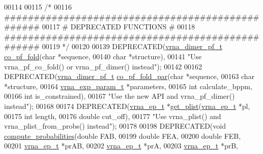 \begin{DoxyCode}
00114 
00115 \textcolor{comment}{/*}
00116 \textcolor{comment}{ #################################################}
00117 \textcolor{comment}{ # DEPRECATED FUNCTIONS                          #}
00118 \textcolor{comment}{ #################################################}
00119 \textcolor{comment}{ */}
00120 
00139 DEPRECATED(\hyperlink{group__pf__cofold_structvrna__dimer__pf__s}{vrna\_dimer\_pf\_t} \hyperlink{part__func__co_8h_ae5c1e7331718669bdae7a86de2be6184}{co\_pf\_fold}(\textcolor{keywordtype}{char}  *sequence,
00140                                       \textcolor{keywordtype}{char}  *structure),
00141 \textcolor{stringliteral}{"Use vrna\_pf\_co\_fold() or vrna\_pf\_dimer() instead"});
00142 
00162 DEPRECATED(\hyperlink{group__pf__cofold_structvrna__dimer__pf__s}{vrna\_dimer\_pf\_t} \hyperlink{part__func__co_8h_aabfc6cb6d02b8f08ac4c92f4f5b125d9}{co\_pf\_fold\_par}(\textcolor{keywordtype}{char}              *sequence,
00163                                           \textcolor{keywordtype}{char}              *structure,
00164                                           \hyperlink{group__energy__parameters_structvrna__exp__param__s}{vrna\_exp\_param\_t}  *parameters,
00165                                           \textcolor{keywordtype}{int}               calculate\_bppm,
00166                                           \textcolor{keywordtype}{int}               is\_constrained),
00167 \textcolor{stringliteral}{"Use the new API and vrna\_pf\_dimer() instead"});
00168 
00174 DEPRECATED(\hyperlink{group__struct__utils_structvrna__elem__prob__s}{vrna\_ep\_t} *\hyperlink{part__func__co_8h_afb35675f133966dc9f8a8c2c9686e13a}{get\_plist}(\hyperlink{group__struct__utils_structvrna__elem__prob__s}{vrna\_ep\_t} *pl,
00175                                 \textcolor{keywordtype}{int}       length,
00176                                 \textcolor{keywordtype}{double}    cut\_off),
00177 \textcolor{stringliteral}{"Use vrna\_plist() and vrna\_plist\_from\_probs() instead"});
00178 
00198 DEPRECATED(\textcolor{keywordtype}{void} \hyperlink{part__func__co_8h_a94c19120130e66a667a10a3c8598550c}{compute\_probabilities}(\textcolor{keywordtype}{double}    FAB,
00199                                       \textcolor{keywordtype}{double}    FEA,
00200                                       \textcolor{keywordtype}{double}    FEB,
00201                                       \hyperlink{group__struct__utils_structvrna__elem__prob__s}{vrna\_ep\_t} *prAB,
00202                                       \hyperlink{group__struct__utils_structvrna__elem__prob__s}{vrna\_ep\_t} *prA,
00203                                       \hyperlink{group__struct__utils_structvrna__elem__prob__s}{vrna\_ep\_t} *prB,

\end{DoxyCode}
